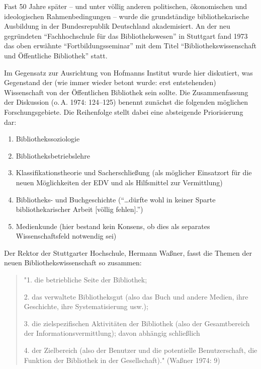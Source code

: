 \documentclass[a4paper,
fontsize=11pt,
oneside,
numbers=noperiodatend,
parskip=half-,
bibliography=totoc,
final
]{scrartcl}
\begin{document}
Fast 50 Jahre später -- und unter völlig anderen politischen,
ökonomischen und ideologischen Rahmenbedingungen -- wurde die
grundständige bibliothekarische Ausbildung in der Bundesrepublik
Deutschland akademisiert. An der neu gegründeten \enquote{Fachhochschule
für das Bibliothekswesen} in Stuttgart fand 1973 das oben erwähnte
\enquote{Fortbildungsseminar} mit dem Titel
\enquote{Bibliothekswissenschaft und Öffentliche Bibliothek} statt.

Im Gegensatz zur Ausrichtung von Hofmanns Institut wurde hier
diskutiert, was Gegenstand der (wie immer wieder betont wurde: erst
entstehenden) Wissenschaft von der Öffentlichen Bibliothek sein sollte.
Die Zusammenfassung der Diskussion (o.\,A. 1974: 124--125) benennt
zunächst die folgenden möglichen Forschungsgebiete. Die Reihenfolge
stellt dabei eine absteigende Priorisierung dar:

\begin{enumerate}
\def\labelenumi{\arabic{enumi}.}
\item
  Bibliothekssoziologie
\item
  Bibliotheksbetriebslehre
\item
  Klassifikationstheorie und Sacherschließung (als möglicher Einsatzort
  für die neuen Möglichkeiten der EDV und als Hilfsmittel zur
  Vermittlung)
\item
  Bibliotheks- und Buchgeschichte (\enquote{\ldots dürfte wohl in keiner
  Sparte bibliothekarischer Arbeit {[}völlig fehlen{]}.})
\item
  Medienkunde (hier bestand kein Konsens, ob dies als separates
  Wissenschaftsfeld notwendig sei)
\end{enumerate}

Der Rektor der Stuttgarter Hochschule, Hermann Waßner, fasst die Themen
der neuen Bibliothekswissenschaft so zusammen:

\begin{quote}
"1. die betriebliche Seite der Bibliothek;

2. das verwaltete Bibliotheksgut (also das Buch und andere Medien, ihre
Geschichte, ihre Systematisierung usw.);

3. die zielspezifischen Aktivitäten der Bibliothek (also der
Gesamtbereich der Informationsvermittlung); davon abhängig schließlich

4. der Zielbereich (also der Benutzer und die potentielle
Benutzerschaft, die Funktion der Bibliothek in der Gesellschaft)."
(Waßner 1974: 9)
\end{quote}
\end{document}
